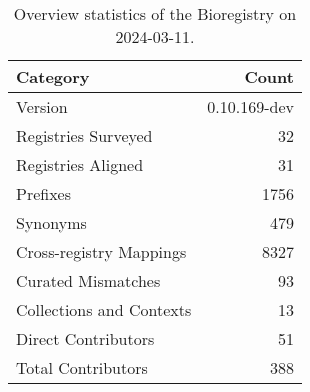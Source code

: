 \begin{table}
\caption{Overview statistics of the Bioregistry on 2024-03-11.}
\label{tab:bioregistry-summary}
\begin{tabular}{lr}
\toprule
Category & Count \\
\midrule
Version & 0.10.169-dev \\
Registries Surveyed & 32 \\
Registries Aligned & 31 \\
Prefixes & 1756 \\
Synonyms & 479 \\
Cross-registry Mappings & 8327 \\
Curated Mismatches & 93 \\
Collections and Contexts & 13 \\
Direct Contributors & 51 \\
Total Contributors & 388 \\
\bottomrule
\end{tabular}
\end{table}
